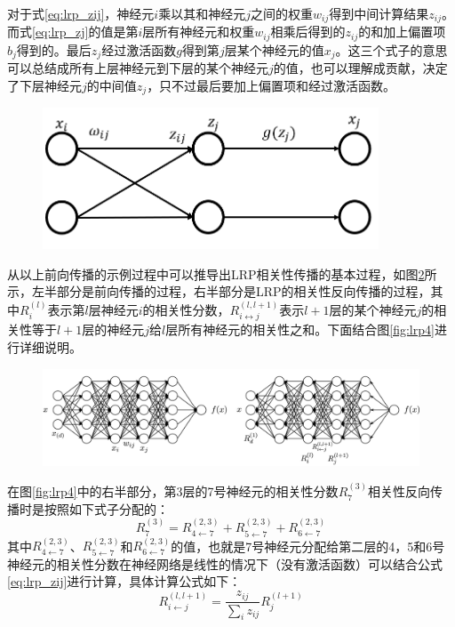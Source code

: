 对于式\ref{eq:lrp_zij}，神经元$i$乘以其和神经元$j$之间的权重$w_{ij}$得到中间计算结果$z_{ij}$。而式\ref{eq:lrp_zj}的值是第$i$层所有神经元和权重$w _{ij}$相乘后得到的$z_{ij}$的和加上偏置项$b_j$得到的。最后$z_j$经过激活函数$g$得到第$j$层某个神经元的值$x_j$。这三个式子的意思可以总结成所有上层神经元到下层的某个神经元$j$的值，也可以理解成贡献，决定了下层神经元$j$的中间值$z_j$，只不过最后要加上偏置项和经过激活函数。

\begin{figure}[h]
	\centering 
	\includegraphics[width=10cm]{fig/ch2/lrp2.png}
	\label{fig:lrp2}
\end{figure}



从以上前向传播的示例过程中可以推导出LRP相关性传播的基本过程，如图\ref{fig:lrp3}所示，左半部分是前向传播的过程，右半部分是LRP的相关性反向传播的过程，其中$R_i^{(l)}$表示第$l$层神经元$i$的相关性分数，$R_{i\leftrightarrow j}^{(l,l+1)}$表示$l+1$层的某个神经元$j$的相关性等于$l+1$层的神经元$j$给$l$层所有神经元的相关性之和。下面结合图\ref{fig:lrp4}进行详细说明。
\begin{figure}[h]
	\centering 
	\includegraphics[width=15cm]{fig/ch2/lrp3.png}
	\label{fig:lrp3}
\end{figure}




在图\ref{fig:lrp4}中的右半部分，第3层的7号神经元的相关性分数$R_{7}^{(3)}$相关性反向传播时是按照如下式子分配的：
\begin{equation}
	R_{7}^{(3)}=R_{4 \leftarrow 7}^{(2,3)}+R_{5 \leftarrow 7}^{(2,3)}+R_{6 \leftarrow 7}^{(2,3)}
\end{equation}
其中$R_{4 \leftarrow 7}^{(2,3)}$、$R_{5 \leftarrow 7}^{(2,3)}$和$R_{6 \leftarrow 7}^{(2,3)}$的值，也就是7号神经元分配给第二层的4，5和6号神经元的相关性分数在神经网络是线性的情况下（没有激活函数）可以结合公式\ref{eq:lrp_zij}进行计算，具体计算公式如下：
\begin{equation}
	R_{i \leftarrow j}^{(l, l+1)}=\frac{z_{i j}}{\sum_{i} z_{i j}} R_{j}^{(l+1)}
	\label{eq:lrp_Rij}
\end{equation}

